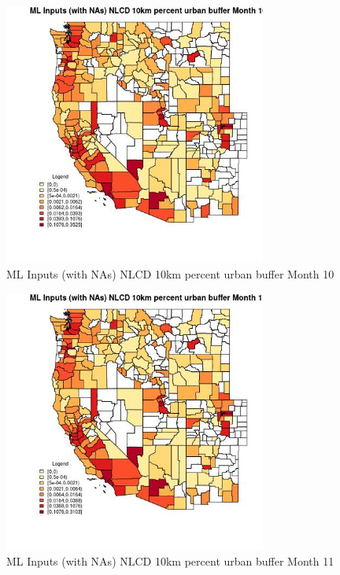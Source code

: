\begin{figure} 
\centering  
\includegraphics[width=0.77\textwidth]{Code_Outputs/Report_ML_input_PM25_Step4_part_f_de_duplicated_aveswNAs_CountyNLCD_10km_percent_urban_buffermedianMonth10.jpg} 
\caption{\label{fig:Report_ML_input_PM25_Step4_part_f_de_duplicated_aveswNAsCountyNLCD_10km_percent_urban_buffermedianMonth10}ML Inputs (with NAs) NLCD 10km percent urban buffer Month 10} 
\end{figure} 
 

\begin{figure} 
\centering  
\includegraphics[width=0.77\textwidth]{Code_Outputs/Report_ML_input_PM25_Step4_part_f_de_duplicated_aveswNAs_CountyNLCD_10km_percent_urban_buffermedianMonth11.jpg} 
\caption{\label{fig:Report_ML_input_PM25_Step4_part_f_de_duplicated_aveswNAsCountyNLCD_10km_percent_urban_buffermedianMonth11}ML Inputs (with NAs) NLCD 10km percent urban buffer Month 11} 
\end{figure} 
 

